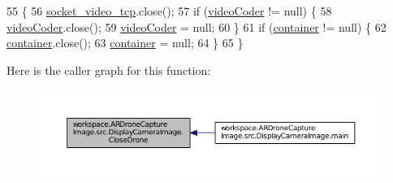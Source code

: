 \begin{DoxyCode}
55                                                      \{
56         \hyperlink{classworkspace_1_1_a_r_drone_capture_image_1_1src_1_1_display_camera_image_a03bb3aa316596a78abdb6f7d6a7c14f8}{socket\_video\_tcp}.close();
57         \textcolor{keywordflow}{if} (\hyperlink{classworkspace_1_1_a_r_drone_capture_image_1_1src_1_1_display_camera_image_a13aa4bcc23766e6bac7e49ea7c882019}{videoCoder} != null) \{
58             \hyperlink{classworkspace_1_1_a_r_drone_capture_image_1_1src_1_1_display_camera_image_a13aa4bcc23766e6bac7e49ea7c882019}{videoCoder}.close();
59             \hyperlink{classworkspace_1_1_a_r_drone_capture_image_1_1src_1_1_display_camera_image_a13aa4bcc23766e6bac7e49ea7c882019}{videoCoder} = null;
60         \}
61         \textcolor{keywordflow}{if} (\hyperlink{classworkspace_1_1_a_r_drone_capture_image_1_1src_1_1_display_camera_image_ad5078e38667c841c5c1d4541741fe5a9}{container} != null) \{
62             \hyperlink{classworkspace_1_1_a_r_drone_capture_image_1_1src_1_1_display_camera_image_ad5078e38667c841c5c1d4541741fe5a9}{container}.close();
63             \hyperlink{classworkspace_1_1_a_r_drone_capture_image_1_1src_1_1_display_camera_image_ad5078e38667c841c5c1d4541741fe5a9}{container} = null;
64         \}
65     \}
\end{DoxyCode}


Here is the caller graph for this function\+:\nopagebreak
\begin{figure}[H]
\begin{center}
\leavevmode
\includegraphics[width=350pt]{classworkspace_1_1_a_r_drone_capture_image_1_1src_1_1_display_camera_image_a4131635745cfbdb78969b00aa7f87b6b_icgraph}
\end{center}
\end{figure}


\hypertarget{classworkspace_1_1_a_r_drone_capture_image_1_1src_1_1_display_camera_image_aefb4b3ec28e6bb1e39bedbb8f67cf4b9}{}
